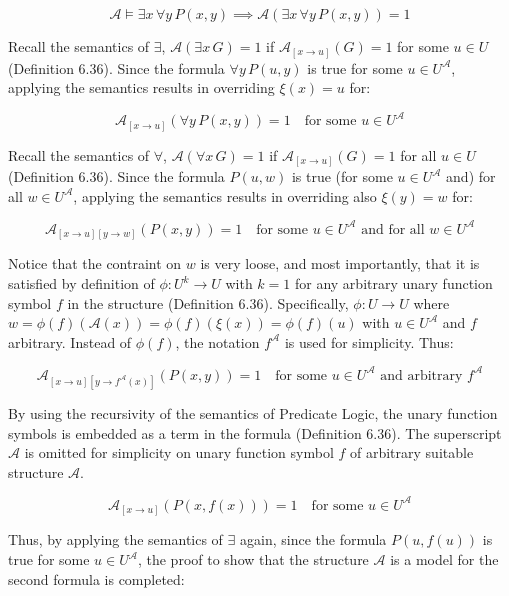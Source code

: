 \documentclass[unicode,11pt,a4paper,oneside,numbers=endperiod,openany]{scrartcl}
\def\struct{\mathcal{A}}
\begin{document}
\[
\struct \models \exists x \, \forall y \, P(x,y) 
\implies 
\struct\left( 
    \exists x \, \forall y \, P(x,y) 
\right) = 1
\]

\noindent Recall the semantics of \( \exists \), 
\( \struct(\exists x \, G) = 1 \) if \( \struct_{[x \to u]}(G) = 1 \) for some \( u \in U \)
(Definition 6.36).
Since the formula \( \forall y \, P(u,y) \) is true for some \( u \in U^\struct \), 
applying the semantics results in overriding \( \xi(x) = u \) for:

\[
\struct_{[x \to u]} 
\left(
    \forall y \, P(x,y)
\right) = 1 \quad \text{for some } u \in U^\struct
\]

\noindent Recall the semantics of \( \forall \),
\( \struct(\forall x \, G) = 1 \) if \( \struct_{[x \to u]}(G) = 1 \) for all \( u \in U \)
(Definition 6.36).
Since the formula \( P(u,w) \) is true (for some \( u \in U^\struct \) and) for all \( w \in U^\struct \),
applying the semantics results in overriding also \( \xi(y) = w \) for:

\[
\struct_{[x \to u][y \to w]} \left(
    P(x,y)
\right) = 1 
\quad \text{for some } u \in U^\struct
\text{ and for all } w \in U^\struct 
\]

\noindent Notice that the contraint on \( w \) is very loose,
and most importantly, that it is satisfied by definition of \( \phi : U^k \to U \) 
with \( k = 1 \) for any arbitrary unary function symbol \( f \) in the structure
(Definition 6.36).
Specifically, \( \phi : U \to U \) 
where \( w = \phi(f)(\struct(x)) = \phi(f)(\xi(x)) = \phi(f)(u) \) 
with \( u \in U^\struct \) and \( f \) arbitrary. 
Instead of \( \phi(f) \), the notation \( f^\struct \) is used for simplicity.
Thus:

\[
\struct_{[x \to u][y \to f^\struct (x)]} \left(
    P(x,y)
\right) = 1 
\quad \text{for some } u \in U^\struct
\text{ and arbitrary } f^\struct
\]

\noindent By using the recursivity of the semantics of Predicate Logic,
the unary function symbols is embedded as a term in the formula
(Definition 6.36). 
The superscript \( \struct \) is omitted for simplicity on unary function symbol \( f \) of 
arbitrary suitable structure \( \struct \).

\[
\struct_{[x \to u]} \left(
    P(x, f(x))
\right) = 1 
\quad \text{for some } u \in U^\struct
\]

\noindent Thus, by applying the semantics of \( \exists \) again,
since the formula \( P(u, f(u)) \) is true for some \( u \in U^\struct \),
the proof to show that the structure \( \struct \) is a model for the second formula is completed:
\end{document}
